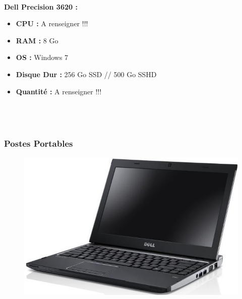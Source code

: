 \documentclass[11pt,a4paper,oneside]{article}
\begin{document}
\paragraph{}\textbf{Dell Precision 3620 :} \\
\begin{itemize}
\item \textbf{CPU :} A renseigner !!!
\item \textbf{RAM :} 8 Go
\item \textbf{OS :} Windows 7
\item \textbf{Disque Dur :} 256 Go SSD // 500 Go SSHD
\item \textbf{Quantité :} A renseigner !!!
\\ \\ \\ \\
\end{itemize}

\newpage
\subsubsection{Postes Portables}
\begin{figure}
\includegraphics[scale=0.4]{Ressources/Materiel/V131.jpg}\vspace{-2cm}
\end{figure}
\end{document}
